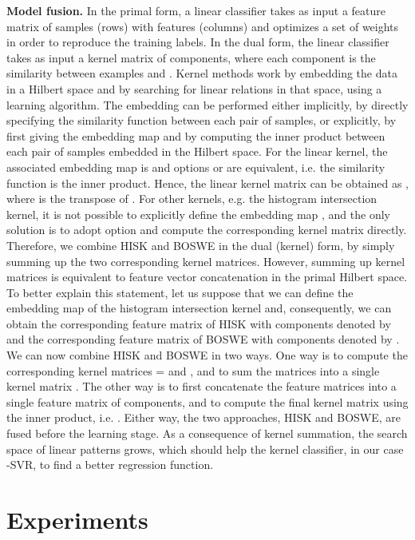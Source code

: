 \documentclass[11pt,a4paper]{article}
\begin{document}
\noindent
{\bf Model fusion.}
In the primal form, a linear classifier takes as input a feature matrix  of  samples (rows) with  features (columns) and optimizes a set of weights in order to reproduce the  training labels. In the dual form, the linear classifier takes as input a kernel matrix  of  components, where each component  is the similarity between examples  and . Kernel methods work by embedding the data in a Hilbert space and by searching for linear relations in that space, using a learning algorithm. The embedding can be performed either  implicitly, by directly specifying the similarity function between each pair of samples, or  explicitly, by first giving the embedding map  and by computing the inner product between each pair of samples embedded in the Hilbert space. For the linear kernel, the associated embedding map is  and options  or  are equivalent, i.e. the similarity function is the inner product. Hence, the linear kernel matrix  can be obtained as , where  is the transpose of . For other kernels, e.g. the histogram intersection kernel, it is not possible to explicitly define the embedding map  \cite{taylor-Cristianini-cup-2004}, and the only solution is to adopt option  and compute the corresponding kernel matrix directly. Therefore, we combine HISK and BOSWE in the dual (kernel) form, by simply summing up the two corresponding kernel matrices. However, summing up kernel matrices is equivalent to feature vector concatenation in the primal Hilbert space. To better explain this statement, let us suppose that we can define the embedding map of the histogram intersection kernel and, consequently, we can obtain the corresponding feature matrix of HISK with  components denoted by  and the corresponding feature matrix of BOSWE with  components denoted by . We can now combine HISK and BOSWE in two ways. One way is to compute the corresponding kernel matrices  =  and , and to sum the matrices into a single kernel matrix . The other way is to first concatenate the feature matrices into a single feature matrix  of  components, and to compute the final kernel matrix using the inner product, i.e. . Either way, the two approaches, HISK and BOSWE, are fused before the learning stage. As a consequence of kernel summation, the search space of linear patterns grows, which should help the kernel classifier, in our case -SVR, to find a better regression function.

\vspace*{-0.1cm} 
\section{Experiments}
\label{sec_Polarity_Experiments}
\end{document}
